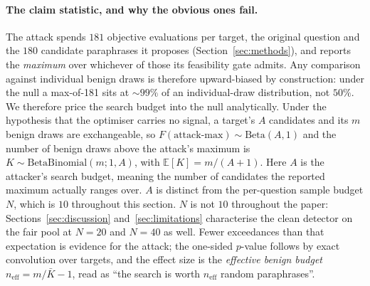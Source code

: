 \begin{table}[t]
\end{table}

\paragraph{The claim statistic, and why the obvious ones fail.}
The attack spends $181$ objective evaluations per target, the original question and the
$180$ candidate paraphrases it proposes (Section~\ref{sec:methods}), and reports the
\emph{maximum} over whichever of those its feasibility gate admits. Any comparison against individual
benign draws is therefore upward-biased by construction: under the null a max-of-181 sits at
$\sim$$99\%$ of an individual-draw distribution, not $50\%$. We
therefore price the search budget into the null analytically. Under the hypothesis that the
optimiser carries no signal, a target's $A$ candidates and its $m$ benign draws are
exchangeable, so $F(\text{attack-max}) \sim \mathrm{Beta}(A,1)$ and the number of benign
draws above the attack's maximum is $K \sim \mathrm{BetaBinomial}(m; 1, A)$, with
$\mathbb{E}[K] = m/(A{+}1)$. Here $A$ is the attacker's search budget, meaning the number of
candidates the reported maximum actually ranges over. $A$ is
distinct from the per-question sample budget $N$, which is $10$ throughout this section.
$N$ is not $10$ throughout the paper: Sections~\ref{sec:discussion}
and~\ref{sec:limitations} characterise the clean detector on the fair pool at $N{=}20$ and
$N{=}40$ as well. Fewer exceedances than that expectation is evidence for the attack; the
one-sided $p$-value follows by exact convolution over targets, and the effect size is the
\emph{effective benign budget} $n_{\mathrm{eff}} = m/\bar{K} - 1$, read as ``the search is
worth $n_{\mathrm{eff}}$ random paraphrases''.

